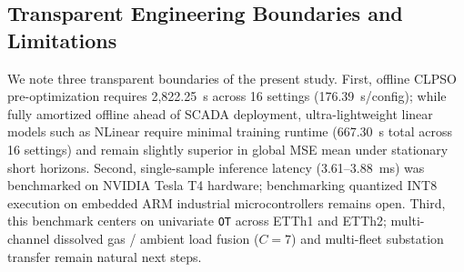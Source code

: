 \documentclass[pdflatex,sn-mathphys-num,referee,lineno]{sn-jnl}
\theoremstyle{thmstyleone}
\theoremstyle{thmstyletwo}
\theoremstyle{thmstylethree}
\begin{document}
\begin{table}[htbp]
\centering
\caption{Comparative positioning of PSO-TCWavKAN against recent \emph{Neural Computing and Applications} landmark studies.}
\label{tab:ncaa_exemplar_comparison}
\end{table}

\subsection{Transparent Engineering Boundaries and Limitations}\label{subsec:limitations}
We note three transparent boundaries of the present study. First, offline CLPSO pre-optimization requires 2,822.25~s across 16 settings (176.39~s/config); while fully amortized offline ahead of SCADA deployment, ultra-lightweight linear models such as NLinear require minimal training runtime (667.30~s total across 16 settings) and remain slightly superior in global MSE mean under stationary short horizons. Second, single-sample inference latency (3.61--3.88~ms) was benchmarked on NVIDIA Tesla T4 hardware; benchmarking quantized INT8 execution on embedded ARM industrial microcontrollers remains open. Third, this benchmark centers on univariate \texttt{OT} across ETTh1 and ETTh2; multi-channel dissolved gas / ambient load fusion ($C=7$) and multi-fleet substation transfer remain natural next steps.
\end{document}
